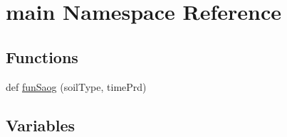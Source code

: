 \hypertarget{namespacemain}{}\section{main Namespace Reference}
\label{namespacemain}
\subsection*{Functions}
\begin{DoxyCompactItemize}
\item 
def \hyperlink{namespacemain_a4f60afd2426ee9409955e4352b3f0486}{fun\+Saog} (soil\+Type, time\+Prd)
\end{DoxyCompactItemize}
\subsection*{Variables}

